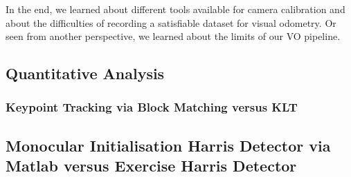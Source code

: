 In the end, we learned about different tools available for camera calibration and about the difficulties of recording a satisfiable dataset
for visual odometry. Or seen from another perspective, we learned about the limits of our VO pipeline.








\subsection{Quantitative Analysis}
\subsubsection{Keypoint Tracking via Block Matching versus KLT}

\subsection{Monocular Initialisation Harris Detector via Matlab versus Exercise Harris Detector}
